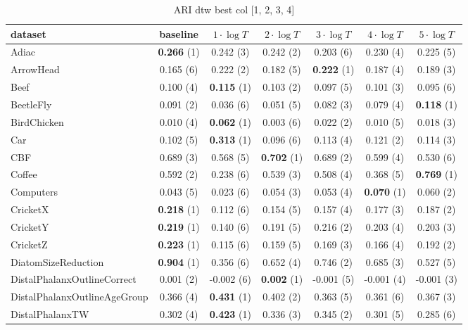     \begin{table}[ht]
    \caption{ARI dtw best col [1, 2, 3, 4]} 
    \begin{adjustbox}{width=\textwidth}
    \begin{tabular}{lcccccc}
    \hline
    dataset & baseline & \textbf{$1\cdot \log{T}$} & \textbf{$2\cdot \log{T}$} & \textbf{$3\cdot \log{T}$} & \textbf{$4\cdot \log{T}$} & \textbf{$5\cdot \log{T}$} \\ \hline
    Adiac & \textbf{0.266} (1) & 0.242 (3) & 0.242 (2) & 0.203 (6) & 0.230 (4) & 0.225 (5) \\
    ArrowHead & 0.165 (6) & 0.222 (2) & 0.182 (5) & \textbf{0.222} (1) & 0.187 (4) & 0.189 (3) \\
    Beef & 0.100 (4) & \textbf{0.115} (1) & 0.103 (2) & 0.097 (5) & 0.101 (3) & 0.095 (6) \\
    BeetleFly & 0.091 (2) & 0.036 (6) & 0.051 (5) & 0.082 (3) & 0.079 (4) & \textbf{0.118} (1) \\
    BirdChicken & 0.010 (4) & \textbf{0.062} (1) & 0.003 (6) & 0.022 (2) & 0.010 (5) & 0.018 (3) \\
    Car & 0.102 (5) & \textbf{0.313} (1) & 0.096 (6) & 0.113 (4) & 0.121 (2) & 0.114 (3) \\
    CBF & 0.689 (3) & 0.568 (5) & \textbf{0.702} (1) & 0.689 (2) & 0.599 (4) & 0.530 (6) \\
    Coffee & 0.592 (2) & 0.238 (6) & 0.539 (3) & 0.508 (4) & 0.368 (5) & \textbf{0.769} (1) \\
    Computers & 0.043 (5) & 0.023 (6) & 0.054 (3) & 0.053 (4) & \textbf{0.070} (1) & 0.060 (2) \\
    CricketX & \textbf{0.218} (1) & 0.112 (6) & 0.154 (5) & 0.157 (4) & 0.177 (3) & 0.187 (2) \\
    CricketY & \textbf{0.219} (1) & 0.140 (6) & 0.191 (5) & 0.216 (2) & 0.203 (4) & 0.203 (3) \\
    CricketZ & \textbf{0.223} (1) & 0.115 (6) & 0.159 (5) & 0.169 (3) & 0.166 (4) & 0.192 (2) \\
    DiatomSizeReduction & \textbf{0.904} (1) & 0.356 (6) & 0.652 (4) & 0.746 (2) & 0.685 (3) & 0.527 (5) \\
    DistalPhalanxOutlineCorrect & 0.001 (2) & -0.002 (6) & \textbf{0.002} (1) & -0.001 (5) & -0.001 (4) & -0.001 (3) \\
    DistalPhalanxOutlineAgeGroup & 0.366 (4) & \textbf{0.431} (1) & 0.402 (2) & 0.363 (5) & 0.361 (6) & 0.367 (3) \\
    DistalPhalanxTW & 0.302 (4) & \textbf{0.423} (1) & 0.336 (3) & 0.345 (2) & 0.301 (5) & 0.285 (6) \\

\end{tabular}
\end{adjustbox}
\end{table}
